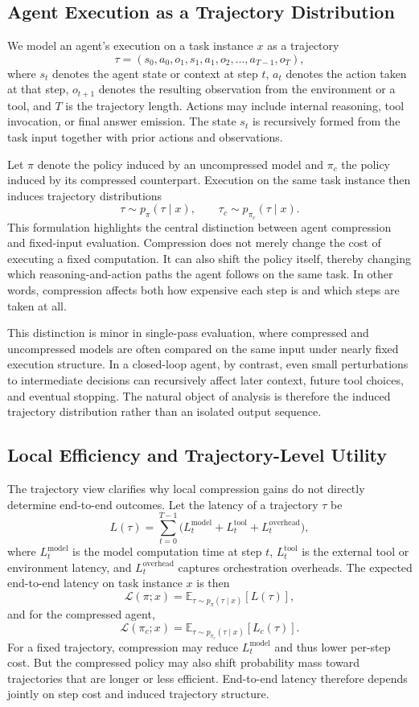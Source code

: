 \documentclass{article}
\begin{document}
\subsection{Agent Execution as a Trajectory Distribution}

We model an agent's execution on a task instance $x$ as a trajectory
\[
\tau = (s_0, a_0, o_1, s_1, a_1, o_2, \dots, a_{T-1}, o_T),
\]
where $s_t$ denotes the agent state or context at step $t$, $a_t$ denotes the action taken at that step, $o_{t+1}$ denotes the resulting observation from the environment or a tool, and $T$ is the trajectory length. Actions may include internal reasoning, tool invocation, or final answer emission. The state $s_t$ is recursively formed from the task input together with prior actions and observations.

Let $\pi$ denote the policy induced by an uncompressed model and $\pi_c$ the policy induced by its compressed counterpart. Execution on the same task instance then induces trajectory distributions
\[
\tau \sim p_{\pi}(\tau \mid x), \qquad \tau_c \sim p_{\pi_c}(\tau \mid x).
\]
This formulation highlights the central distinction between agent compression and fixed-input evaluation. Compression does not merely change the cost of executing a fixed computation. It can also shift the policy itself, thereby changing which reasoning-and-action paths the agent follows on the same task. In other words, compression affects both how expensive each step is and which steps are taken at all.

This distinction is minor in single-pass evaluation, where compressed and uncompressed models are often compared on the same input under nearly fixed execution structure. In a closed-loop agent, by contrast, even small perturbations to intermediate decisions can recursively affect later context, future tool choices, and eventual stopping. The natural object of analysis is therefore the induced trajectory distribution rather than an isolated output sequence.

\subsection{Local Efficiency and Trajectory-Level Utility}

The trajectory view clarifies why local compression gains do not directly determine end-to-end outcomes. Let the latency of a trajectory $\tau$ be
\[
L(\tau) = \sum_{t=0}^{T-1}\bigl(L_t^{\mathrm{model}} + L_t^{\mathrm{tool}} + L_t^{\mathrm{overhead}}\bigr),
\]
where $L_t^{\mathrm{model}}$ is the model computation time at step $t$, $L_t^{\mathrm{tool}}$ is the external tool or environment latency, and $L_t^{\mathrm{overhead}}$ captures orchestration overheads. The expected end-to-end latency on task instance $x$ is then
\[
\mathcal{L}(\pi; x) = \mathbb{E}_{\tau \sim p_{\pi}(\tau \mid x)}[L(\tau)],
\]
and for the compressed agent,
\[
\mathcal{L}(\pi_c; x) = \mathbb{E}_{\tau \sim p_{\pi_c}(\tau \mid x)}[L_c(\tau)].
\]
For a fixed trajectory, compression may reduce $L_t^{\mathrm{model}}$ and thus lower per-step cost. But the compressed policy may also shift probability mass toward trajectories that are longer or less efficient. End-to-end latency therefore depends jointly on step cost and induced trajectory structure.
\end{document}
